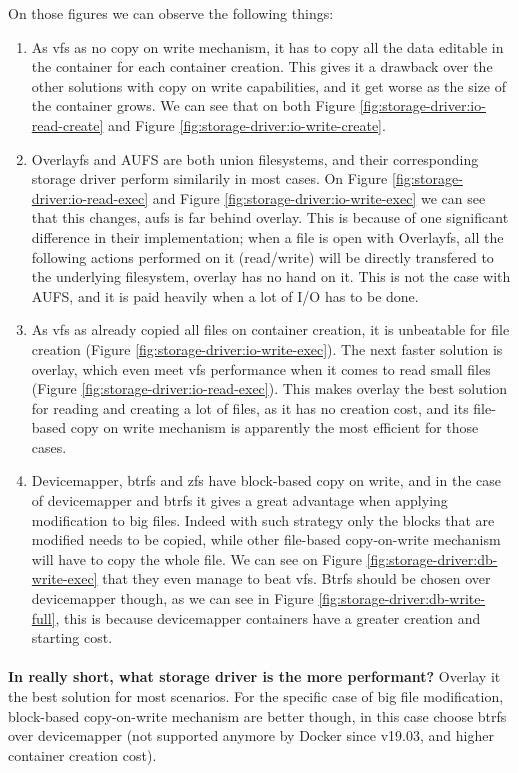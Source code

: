 On those figures we can observe the following things:
\begin{enumerate}
  \item As vfs as no copy on write mechanism, it has to copy all the data editable in the container for each container creation.  This gives it a drawback over the other solutions with copy on write capabilities, and it get worse as the size of the container grows.  We can see that on both Figure \ref{fig:storage-driver:io-read-create} and Figure \ref{fig:storage-driver:io-write-create}.
  \item Overlayfs and AUFS are both union filesystems, and their corresponding storage driver perform similarily in most cases.  On Figure \ref{fig:storage-driver:io-read-exec} and Figure \ref{fig:storage-driver:io-write-exec} we can see that this changes, aufs is far behind overlay.  This is because of one significant difference in their implementation; when a file is open with Overlayfs, all the following actions performed on it (read/write) will be directly transfered to the underlying filesystem, overlay has no hand on it.  This is not the case with AUFS, and it is paid heavily when a lot of I/O has to be done.
  \item As vfs as already copied all files on container creation, it is unbeatable for file creation (Figure \ref{fig:storage-driver:io-write-exec}).  The next faster solution is overlay, which even meet vfs performance when it comes to read small files (Figure \ref{fig:storage-driver:io-read-exec}).  This makes overlay the best solution for reading and creating a lot of files, as it has no creation cost, and its file-based copy on write mechanism is apparently the most efficient for those cases.
  \item Devicemapper, btrfs and zfs have block-based copy on write, and in the case of devicemapper and btrfs it gives a great advantage when applying modification to big files.  Indeed with such strategy only the blocks that are modified needs to be copied, while other file-based copy-on-write mechanism will have to copy the whole file.  We can see on Figure \ref{fig:storage-driver:db-write-exec} that they even manage to beat vfs.  Btrfs should be chosen over devicemapper though, as we can see in Figure \ref{fig:storage-driver:db-write-full}, this is because devicemapper containers have a greater creation and starting cost.
\end{enumerate}

\paragraph{}\textbf{In really short, what storage driver is the more performant?}
Overlay it the best solution for most scenarios.  For the specific case of big file modification, block-based copy-on-write mechanism are better though, in this case choose btrfs over devicemapper (not supported anymore by Docker since v19.03, and higher container creation cost).

